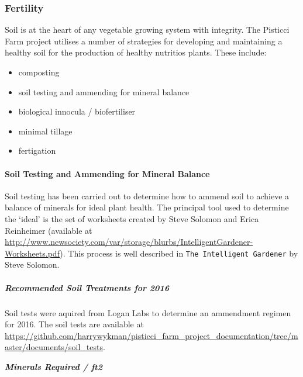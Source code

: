 \subsubsection{Fertility}\label{fertility}

Soil is at the heart of any vegetable growing system with integrity. The
Pisticci Farm project utilises a number of strategies for developing and
maintaining a healthy soil for the production of healthy nutritios
plants. These include:

\begin{itemize}
\itemsep1pt\parskip0pt
\item
  composting
\item
  soil testing and ammending for mineral balance
\item
  biological innocula / biofertiliser
\item
  minimal tillage
\item
  fertigation
\end{itemize}

\paragraph{Soil Testing and Ammending for Mineral
Balance}\label{soil-testing-and-ammending-for-mineral-balance}

Soil testing has been carried out to determine how to ammend soil to
achieve a balance of minerals for ideal plant health. The principal tool
used to determine the `ideal' is the set of worksheets created by Steve
Solomon and Erica Reinheimer (available at
\url{http://www.newsociety.com/var/storage/blurbs/IntelligentGardener-Worksheets.pdf}).
This process is well described in \texttt{The Intelligent Gardener} by
Steve Solomon.

\subparagraph{Recommended Soil Treatments for
2016}\label{recommended-soil-treatments-for-2016}

Soil tests were aquired from Logan Labs to determine an ammendment
regimen for 2016. The soil tests are available at
\url{https://github.com/harrywykman/pisticci_farm_project_documentation/tree/master/documents/soil_tests}.

\textbf{\emph{Minerals Required / ft2}}

